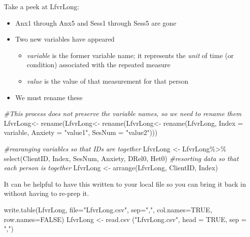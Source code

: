 \documentclass[
  english,
]{book}
\newenvironment{Shaded}{\begin{snugshade}}{\end{snugshade}}
\newcommand{\AttributeTok}[1]{\textcolor[rgb]{0.77,0.63,0.00}{#1}}
\newcommand{\CommentTok}[1]{\textcolor[rgb]{0.56,0.35,0.01}{\textit{#1}}}
\newcommand{\ConstantTok}[1]{\textcolor[rgb]{0.00,0.00,0.00}{#1}}
\newcommand{\FunctionTok}[1]{\textcolor[rgb]{0.00,0.00,0.00}{#1}}
\newcommand{\NormalTok}[1]{#1}
\newcommand{\OtherTok}[1]{\textcolor[rgb]{0.56,0.35,0.01}{#1}}
\newcommand{\SpecialCharTok}[1]{\textcolor[rgb]{0.00,0.00,0.00}{#1}}
\newcommand{\StringTok}[1]{\textcolor[rgb]{0.31,0.60,0.02}{#1}}
\providecommand{\tightlist}{%
  \setlength{\itemsep}{0pt}\setlength{\parskip}{0pt}}
\begin{document}
Take a peek at LfvrLong:

\begin{itemize}
\tightlist
\item
  Anx1 through Anx5 and Sess1 through Sess5 are gone
\item
  Two new variables have appeared

  \begin{itemize}
  \tightlist
  \item
    \emph{variable} is the former variable name; it represents the \emph{unit} of time (or condition) associated with the repeated measure
  \item
    \emph{value} is the value of that measurement for that person
  \end{itemize}
\item
  We must rename these
\end{itemize}

\begin{Shaded}
\begin{Highlighting}[]
\CommentTok{\#This process  does not preserve the variable names, so we need to rename them}
\NormalTok{LfvrLong}\OtherTok{\textless{}{-}}  \FunctionTok{rename}\NormalTok{(LfvrLong}\OtherTok{\textless{}{-}}  \FunctionTok{rename}\NormalTok{(LfvrLong}\OtherTok{\textless{}{-}}  \FunctionTok{rename}\NormalTok{(LfvrLong, }\AttributeTok{Index =}\NormalTok{ variable, }\AttributeTok{Anxiety =} \StringTok{"value1"}\NormalTok{, }\AttributeTok{SesNum =} \StringTok{"value2"}\NormalTok{)))}

\CommentTok{\#rearanging variables so that IDs are together}
\NormalTok{LfvrLong }\OtherTok{\textless{}{-}}\NormalTok{ LfvrLong}\SpecialCharTok{\%\textgreater{}\%}
  \FunctionTok{select}\NormalTok{(ClientID, Index, SesNum, Anxiety, DRel0, Het0)}
\CommentTok{\#resorting data so that each person is together}
\NormalTok{LfvrLong }\OtherTok{\textless{}{-}} \FunctionTok{arrange}\NormalTok{(LfvrLong, ClientID, Index)}
\end{Highlighting}
\end{Shaded}

It can be helpful to have this written to your local file so you can bring it back in without having to re-prep it.

\begin{Shaded}
\begin{Highlighting}[]
\FunctionTok{write.table}\NormalTok{(LfvrLong, }\AttributeTok{file=}\StringTok{"LfvrLong.csv"}\NormalTok{, }\AttributeTok{sep=}\StringTok{","}\NormalTok{, }\AttributeTok{col.names=}\ConstantTok{TRUE}\NormalTok{, }\AttributeTok{row.names=}\ConstantTok{FALSE}\NormalTok{)}
\NormalTok{LfvrLong }\OtherTok{\textless{}{-}} \FunctionTok{read.csv}\NormalTok{ (}\StringTok{"LfvrLong.csv"}\NormalTok{, }\AttributeTok{head =} \ConstantTok{TRUE}\NormalTok{, }\AttributeTok{sep =} \StringTok{","}\NormalTok{)}
\end{Highlighting}
\end{Shaded}
\end{document}

